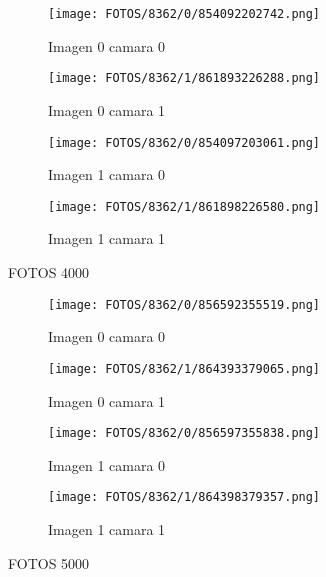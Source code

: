\documentclass{article}
\begin{document}
\begin{figure}[H]
  \centering
  \begin{minipage}[b]{0.45\textwidth}
    \centering
    \texttt{[image: FOTOS/8362/0/854092202742.png]}
    \caption{Imagen 0 camara 0}
  \end{minipage}
  \begin{minipage}[b]{0.45\textwidth}
    \centering
    \texttt{[image: FOTOS/8362/1/861893226288.png]}
    \caption{Imagen 0 camara 1}
  \end{minipage}
  \begin{minipage}[b]{0.45\textwidth}
    \centering
    \texttt{[image: FOTOS/8362/0/854097203061.png]}
    \caption{Imagen 1 camara 0}
  \end{minipage}
  \begin{minipage}[b]{0.45\textwidth}
    \centering
    \texttt{[image: FOTOS/8362/1/861898226580.png]}
    \caption{Imagen 1 camara 1}
  \end{minipage}
\end{figure}

FOTOS 4000

\begin{figure}[H]
  \centering
  \begin{minipage}[b]{0.45\textwidth}
    \centering
    \texttt{[image: FOTOS/8362/0/856592355519.png]}
    \caption{Imagen 0 camara 0}
  \end{minipage}
  \begin{minipage}[b]{0.45\textwidth}
    \centering
    \texttt{[image: FOTOS/8362/1/864393379065.png]}
    \caption{Imagen 0 camara 1}
  \end{minipage}
  \begin{minipage}[b]{0.45\textwidth}
    \centering
    \texttt{[image: FOTOS/8362/0/856597355838.png]}
    \caption{Imagen 1 camara 0}
  \end{minipage}
  \begin{minipage}[b]{0.45\textwidth}
    \centering
    \texttt{[image: FOTOS/8362/1/864398379357.png]}
    \caption{Imagen 1 camara 1}
  \end{minipage}
\end{figure}

FOTOS 5000
\end{document}
